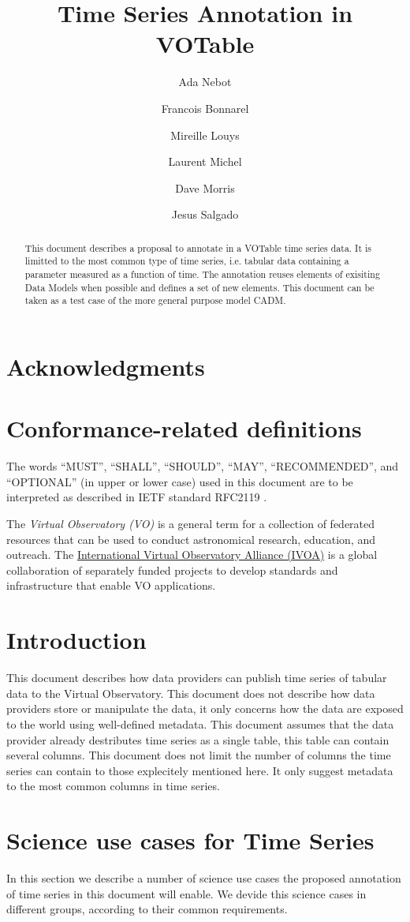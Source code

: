 \documentclass[11pt,a4paper]{ivoa}
\title{Time Series Annotation in VOTable}
\author[http://www.ivoa.net/twiki/bin/view/IVOA/AdaNebot]{Ada Nebot}
\author[http://www.ivoa.net/twiki/bin/view/IVOA/FrancoisBonnarel]{Francois Bonnarel}
\author[http://www.ivoa.net/twiki/bin/view/IVOA/MireilleLouys]{Mireille Louys}
\author[http://www.ivoa.net/twiki/bin/view/IVOA/LaurentMichel]{Laurent Michel}
\author[http://www.ivoa.net/twiki/bin/view/IVOA/DaveMorris]{Dave Morris}
\author[http://www.ivoa.net/twiki/bin/view/IVOA/JesusSalgado]{Jesus Salgado}
\begin{document}
\begin{abstract}
  This document describes a proposal to annotate in a VOTable time series data. It is limitted to the most common type of time series, i.e. tabular data containing a parameter measured as a function of time. The annotation reuses elements of exisiting Data Models when possible and defines a set of new elements. This document can be taken as a test case of the more general purpose model CADM. 
\end{abstract}

\section*{Acknowledgments}

\section*{Conformance-related definitions}

The words ``MUST'', ``SHALL'', ``SHOULD'', ``MAY'', ``RECOMMENDED'', and
``OPTIONAL'' (in upper or lower case) used in this document are to be
interpreted as described in IETF standard RFC2119 \citep{std:RFC2119}.

The \emph{Virtual Observatory (VO)} is a
general term for a collection of federated resources that can be used
to conduct astronomical research, education, and outreach.
The \href{http://www.ivoa.net}{International
Virtual Observatory Alliance (IVOA)} is a global
collaboration of separately funded projects to develop standards and
infrastructure that enable VO applications.


\section{Introduction}
This document describes how data providers can publish time series of tabular data to the Virtual Observatory. This document does not describe how data providers store or manipulate the data, it only concerns how the data are exposed to the world using well-defined metadata. This document assumes that the data provider already destributes time series as a single table, this table can contain several columns. This document does not limit the number of columns the time series can contain to those explecitely mentioned here. It only suggest metadata to the most common columns in time series.  

\section{Science use cases for Time Series}
In this section we describe a number of science use cases the proposed annotation of time series in this document will enable. We devide this science cases in different groups, according to their common requirements. 
\end{document}
